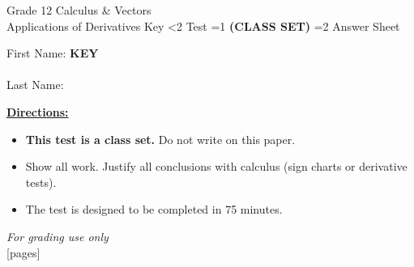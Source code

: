 \documentclass[addpoints]{exam}
\newcommand{\event}{Applications of Derivatives}
\newcommand{\tournament}{}
\def\type{0}
\begin{document}
\begin{center}
    {\huge Grade 12 Calculus \& Vectors \\ \event
    \ifprintanswers \space Key
    \else \space \ifnum\type<2 Test \fi \ifnum\type=1 \textbf{(CLASS SET)} \fi
          \ifnum\type=2 Answer Sheet \fi
    \fi \\ \vspace{3mm}\tournament\vspace{1mm}}
\end{center}

\vspace{.25\textheight}

\begin{center}
    First Name: \ifprintanswers
    \underline{\hspace{3.5cm}}\textbf{KEY}\underline{\hspace{5.5cm}}\\\vspace{5mm}
    \else \underline{\hspace{10cm}}\\ \vspace{5mm} \fi
    Last Name: \underline{\hspace{10cm}}\\ \vspace{5mm}
\end{center}

\noindent\textbf{\underline{Directions:}}
\begin{itemize}
    \ifnum\type=1 \item \textbf{This test is a class set.} Do not write on this paper. \fi
    \item Show all work. Justify all conclusions with calculus (sign charts or derivative tests).
    \item The test is designed to be completed in 75 minutes.
\end{itemize}
\begin{center}
\textit{For grading use only}\\
[pages]
\end{center}
\end{document}
